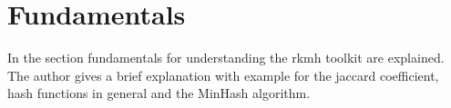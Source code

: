 \section{Fundamentals}

In the section fundamentals for understanding the rkmh toolkit are explained. The author gives a brief explanation with example for the jaccard coefficient, hash functions in general and the MinHash algorithm.



